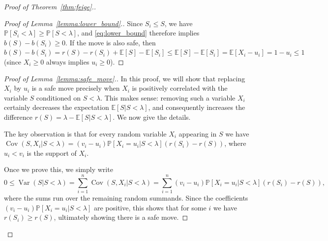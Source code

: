 \documentclass[10pt]{article}
\newcommand{\bE}{\mathbb{E}}
\newcommand{\Pb}{\mathbb P}
\newcommand{\Var}{\operatorname{Var}}
\newcommand{\Cov}{\operatorname{Cov}}
\begin{document}
\begin{proof}[Proof of Theorem~\ref{thm:feige}.]
\begin{proof}[Proof of Lemma~\ref{lemma:lower_bound}.]
Since $S_i\le S$, we have $\Pb[S_i<\lambda]\ge \Pb[S<\lambda]$, and \eqref{eq:lower_bound} therefore implies $b(S)-b(S_i)\ge 0$. If the move is also safe, then $b(S)-b(S_i)=r(S)-r(S_i)+\bE[S]-\bE[S_i]\le \bE[S]-\bE[S_i]=\bE[X_i-u_i]=1-u_i\leq 1$ (since $X_i\geq 0$ always implies $u_i\geq 0$).
\end{proof}

\begin{proof}[Proof of Lemma~\ref{lemma:safe_move}.]
In this proof, we will show that replacing $X_i$ by $u_i$ is a safe move precisely when $X_i$ is positively correlated with the variable $S$ conditioned on $S<\lambda$. This makes sense: removing such a variable $X_i$ certainly decreases the expectation $\bE[S|S<\lambda]$, and consequently increases the difference $r(S)=\lambda-\bE[S|S<\lambda]$. We now give the details.

The key observation is that for every random variable $X_i$ appearing in $S$ we have $\Cov(S, X_i|S<\lambda)=(v_i-u_i)\Pb[X_i=u_i|S<\lambda](r(S_i)-r(S))$, where $u_i<v_i$ is the support of $X_i$.

Once we prove this, we simply write \vspace{-0.1cm}\[0\leq \Var(S|S<\lambda)=\sum_{i=1}^n \Cov(S, X_i|S<\lambda)=\sum_{i=1}^n (v_i-u_i)\Pb[X_i=u_i|S<\lambda](r(S_i)-r(S)),\] where the sums run over the remaining random summands. Since the coefficients $(v_i-u_i)\Pb[X_i=u_i|S<\lambda]$ are positive, this shows that for some $i$ we have $r(S_i)\geq r(S)$, ultimately showing there is a safe move.


\end{proof}
\end{proof}
\end{document}
